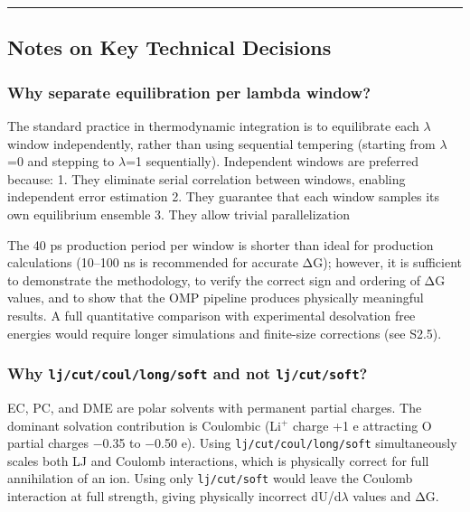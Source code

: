 \documentclass[
  11pt,
]{article}
\begin{document}
\begin{center}\rule{0.5\linewidth}{0.5pt}\end{center}

\subsection{Notes on Key Technical
Decisions}\label{notes-on-key-technical-decisions}

\subsubsection{Why separate equilibration per lambda
window?}\label{why-separate-equilibration-per-lambda-window}

The standard practice in thermodynamic integration is to equilibrate
each \(\lambda\) window independently, rather than using sequential
tempering (starting from \(\lambda\)=0 and stepping to \(\lambda\)=1
sequentially). Independent windows are preferred because: 1. They
eliminate serial correlation between windows, enabling independent error
estimation 2. They guarantee that each window samples its own
equilibrium ensemble 3. They allow trivial parallelization

The 40 ps production period per window is shorter than ideal for
production calculations (10--100 ns is recommended for accurate ΔG);
however, it is sufficient to demonstrate the methodology, to verify the
correct sign and ordering of ΔG values, and to show that the OMP
pipeline produces physically meaningful results. A full quantitative
comparison with experimental desolvation free energies would require
longer simulations and finite-size corrections (see S2.5).

\subsubsection{\texorpdfstring{Why \texttt{lj/cut/coul/long/soft} and
not
\texttt{lj/cut/soft}?}{Why lj/cut/coul/long/soft and not lj/cut/soft?}}\label{why-ljcutcoullongsoft-and-not-ljcutsoft}

EC, PC, and DME are polar solvents with permanent partial charges. The
dominant solvation contribution is Coulombic (Li\(^{+}\) charge +1 e
attracting O partial charges −0.35 to −0.50 e). Using
\texttt{lj/cut/coul/long/soft} simultaneously scales both LJ and Coulomb
interactions, which is physically correct for full annihilation of an
ion. Using only \texttt{lj/cut/soft} would leave the Coulomb interaction
at full strength, giving physically incorrect dU/d\(\lambda\) values and
ΔG.
\end{document}
